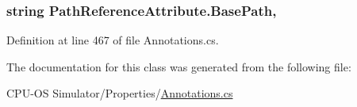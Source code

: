 \subsubsection[{Base\+Path}]{\setlength{\rightskip}{0pt plus 5cm}string Path\+Reference\+Attribute.\+Base\+Path\hspace{0.3cm}{\ttfamily [get]}, {}}\label{class_path_reference_attribute_ae6cf5aa92a7198b24c0656f974c3738d}


Definition at line 467 of file Annotations.\+cs.



The documentation for this class was generated from the following file\+:\begin{DoxyCompactItemize}
\item 
C\+P\+U-\/\+O\+S Simulator/\+Properties/\hyperlink{_annotations_8cs}{Annotations.\+cs}\end{DoxyCompactItemize}
